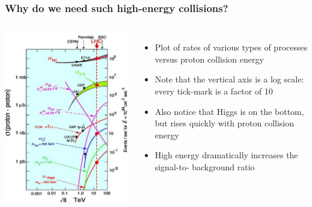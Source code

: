 \documentclass[compress]{beamer}
\begin{document}
\begin{frame}
\frametitle{Why do we need such high-energy collisions?}

\begin{columns}
\includegraphics[width=\linewidth]{cross-sections.jpg}

\begin{itemize}\setlength{\itemsep}{0.2 cm}
\item Plot of rates of various types of processes versus proton collision energy

\item Note that the vertical axis is a log scale: every tick-mark is a
  factor of 10

\item Also notice that Higgs is on the bottom, but rises quickly with
  proton collision energy

\item High energy dramatically increases the signal-to- background ratio
\end{itemize}
\end{columns}
\end{frame}
\end{document}
